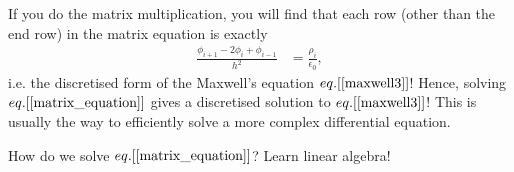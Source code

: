 \documentclass[paper=a4,fontsize=11pt]{scrartcl} %
\begin{document}
If you do the matrix multiplication, you will find that each row (other than the end row) in the matrix equation is exactly 
\begin{align}
    \frac{\phi_{i+1} - 2\phi_i + \phi_{i-1}}{h^2} &= \frac{\rho_i}{\epsilon_0},
\end{align}
i.e. the discretised form of the Maxwell's equation $eq.[\ref{maxwell3}]$! Hence, solving $eq.[\ref{matrix_equation}]$ gives a discretised solution to $eq.[\ref{maxwell3}]$! This is usually the way to efficiently solve a more complex differential equation. 

How do we solve $eq.[\ref{matrix_equation}]$? Learn linear algebra!
\end{document}
